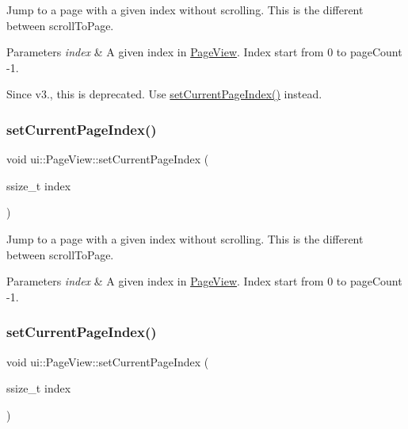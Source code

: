 Jump to a page with a given index without scrolling. This is the different between scroll\+To\+Page.


\begin{DoxyParams}{Parameters}
{\em index} & A given index in \hyperlink{classui_1_1PageView}{Page\+View}. Index start from 0 to page\+Count -\/1.\\
\hline
\end{DoxyParams}
Since v3., this is deprecated. Use {\ttfamily \hyperlink{classui_1_1PageView_a919770a660944565ae72d4cc4b571121}{set\+Current\+Page\+Index()}} instead. \mbox{\label{classui_1_1PageView_a919770a660944565ae72d4cc4b571121}} 
\subsubsection{\texorpdfstring{set\+Current\+Page\+Index()}{setCurrentPageIndex()}\hspace{0.1cm}{\footnotesize\ttfamily [1/2]}}
{\footnotesize\ttfamily void ui\+::\+Page\+View\+::set\+Current\+Page\+Index (\begin{DoxyParamCaption}\item[{ssize\+\_\+t}]{index }\end{DoxyParamCaption})}

Jump to a page with a given index without scrolling. This is the different between scroll\+To\+Page.


\begin{DoxyParams}{Parameters}
{\em index} & A given index in \hyperlink{classui_1_1PageView}{Page\+View}. Index start from 0 to page\+Count -\/1. \\
\hline
\end{DoxyParams}
\mbox{\label{classui_1_1PageView_a919770a660944565ae72d4cc4b571121}} 
\subsubsection{\texorpdfstring{set\+Current\+Page\+Index()}{setCurrentPageIndex()}\hspace{0.1cm}{\footnotesize\ttfamily [2/2]}}
{\footnotesize\ttfamily void ui\+::\+Page\+View\+::set\+Current\+Page\+Index (\begin{DoxyParamCaption}\item[{ssize\+\_\+t}]{index }\end{DoxyParamCaption})}


